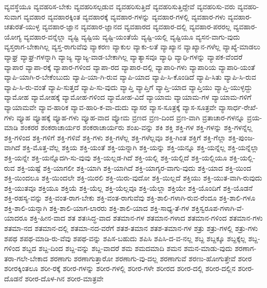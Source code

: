 {ವ್ಯವಸ್ಥೆಯೂ
ವ್ಯವಹರಿಸ-ಬೇಕು
ವ್ಯವಹರಿಸಲ್ಪಡುವ
ವ್ಯವಹರಿಸುತ್ತಿದೆ
ವ್ಯವಹರಿಸುತ್ತಿದ್ದೇವೆ
ವ್ಯವಹರಿಸು-ವರು
ವ್ಯವಹರಿ-ಸುವಾಗ
ವ್ಯವಹಾರ
ವ್ಯವಹಾರಕ್ಕಿಂತ
ವ್ಯವಹಾರಕ್ಕೆ
ವ್ಯವಹಾರ-ಗಳನ್ನು
ವ್ಯವಹಾರ-ಗಳಲ್ಲಿ
ವ್ಯವಹಾರ-ಗಳು
ವ್ಯವಹಾರ-ಚತುರತೆ-ಯುಳ್ಳ
ವ್ಯವಹಾರ-ಜ್ಞಾನ
ವ್ಯವಹಾರ-ಜ್ಞಾನದ
ವ್ಯವಹಾರದ
ವ್ಯವಹಾರ-ದಲ್ಲಿ
ವ್ಯವಹಾರ-ಪರರಲ್ಲ
ವ್ಯವಹಾರ-ಯೋಗ್ಯ
ವ್ಯವಹಾರ-ವನ್ನೆಲ್ಲಾ
ವ್ಯಷ್ಟಿ
ವ್ಯಷ್ಟಿಯ
ವ್ಯಷ್ಟಿ-ಯಂತೆಯೆ
ವ್ಯಷ್ಟಿ-ಯಲ್ಲಿ
ವ್ಯಷ್ಟಿಯೂ
ವ್ಯಸನ-ವಾಗು-ವುದು
ವ್ಯಸ್ತರಾಗ-ಬೇಕಾಗಿಲ್ಲ
ವ್ಯಸ್ತ-ರಾಗುವೆವು
ವ್ಯಾಕರಣ
ವ್ಯಾಕುಲ
ವ್ಯಾಕು-ಲತೆ
ವ್ಯಾಖ್ಯಾನ
ವ್ಯಾಖ್ಯಾನ-ಗಳೆಲ್ಲ
ವ್ಯಾಖ್ಯೆ-ಮಾಡಲು
ವ್ಯಾಘ್ರ
ವ್ಯಾಘ್ರ-ಗಳನ್ನಾಗಿ
ವ್ಯಾಜ್ಯ
ವ್ಯಾಜ್ಯ-ವಾಡ-ಬೇಕಾಗಿಲ್ಲ
ವ್ಯಾತ್ಯಾಸವೂ
ವ್ಯಾಧಿ
ವ್ಯಾಧಿ-ಗಳನ್ನು
ವ್ಯಾಪಕ-ವೆಂದರೆ
ವ್ಯಾಪಾರ
ವ್ಯಾಪಾ-ರಕ್ಕೆ
ವ್ಯಾಪಾರ-ಗಳಿಂದ
ವ್ಯಾಪಾ-ರದ
ವ್ಯಾಪಾರ-ದಲ್ಲಿ
ವ್ಯಾಪಾರಿ-ಗಳು
ವ್ಯಾಪಾರಿಯ
ವ್ಯಾಪಾರಿ-ಯಂತೆ
ವ್ಯಾಪಿ-ಯಾಗಿ-ರ-ಬೇಕೆಂಬುದು
ವ್ಯಾಪಿ-ಯಾ-ಗಿ-ರುವ
ವ್ಯಾಪಿ-ಯಾದ
ವ್ಯಾಪಿ-ಸಿ-ಕೊಂಡಿದೆ
ವ್ಯಾಪಿ-ಸಿತು
ವ್ಯಾಪಿ-ಸಿ-ರುವ
ವ್ಯಾಪಿ-ಸಿ-ರು-ವಂತೆ
ವ್ಯಾಪಿ-ಸುತ್ತದೆ
ವ್ಯಾಪಿ-ಸು-ವುದು
ವ್ಯಾಪ್ತಿ
ವ್ಯಾಪ್ತಿಗೆ
ವ್ಯಾಪ್ತಿ-ಯಾದ
ವ್ಯಾಪ್ತಿಯು
ವ್ಯಾಪ್ತಿ-ಯುಳ್ಳದ್ದು
ವ್ಯಾಮೋಹ
ವ್ಯಾಮೋಹಕ್ಕೆ
ವ್ಯಾಮೋಹ-ಗಳಿಂದ
ವ್ಯಾಮೋಹ-ವಿದೆ
ವ್ಯಾಯಾಮ
ವ್ಯಾಯಾಮ-ಗಳ
ವ್ಯಾಯಾಮ-ಗಳಿಗೆ
ವ್ಯಾಯಾಮವೇ
ವ್ಯಾವ-ಹಾರಿಕ
ವ್ಯಾವ-ಹಾರಿ-ಕ-ವಾ-ದುದು
ವ್ಯಾಸರ
ವ್ಯಾಸ-ಸೂತ್ರಕ್ಕೆ
ವ್ಯಾಸ-ಸೂತ್ರವೇ
ವ್ಯಾಸಾರ್ಧ-ರೇಖೆ-ಗಳು
ವ್ಯೂಹ
ವ್ಯೂಹಕ್ಕೆ
ವ್ಯೂಹ-ಗಳು
ವ್ಯೂಹ-ವಾದ
ವ್ಯೋಮ
ವ್ರಣದ
ವ್ರಣ-ದಿಂದ
ವ್ರಣ-ವಾಗಿ
ವ್ರತಾಚಾರ-ಗಳನ್ನೂ
ವ್ರಯ-ಮಾಡಿ
ಶಂಕರರ
ಶಂಕರಾಚಾರ್ಯರ
ಶಂಕರಾಚಾರ್ಯರು
ಶಂಖ-ವನ್ನು
ಶಕಿ
ಶಕ್ತಿ
ಶಕ್ತಿ-ಗಳ
ಶಕ್ತಿ-ಗಳನ್ನು
ಶಕ್ತಿ-ಗಳನ್ನೆಲ್ಲ
ಶಕ್ತಿ-ಗಳಿಂದ
ಶಕ್ತಿ-ಗಳಿಗೆ
ಶಕ್ತಿ-ಗಳಿವೆ
ಶಕ್ತಿ-ಗಳು
ಶಕ್ತಿ-ಗಳೆಲ್ಲ
ಶಕ್ತಿ-ಗಳೆಲ್ಲವೂ
ಶಕ್ತಿ-ಗಿಂತ
ಶಕ್ತಿಗೆ
ಶಕ್ತಿ-ಗೆಲ್ಲಾ
ಶಕ್ತಿ-ಪುಂಜ-ವಾಗಿದೆ
ಶಕ್ತಿ-ಮೊತ್ತ-ವೆಲ್ಲ
ಶಕ್ತಿಯ
ಶಕ್ತಿ-ಯಂತೆ
ಶಕ್ತಿ-ಯನ್ನಾಗಿ
ಶಕ್ತಿ-ಯನ್ನು
ಶಕ್ತಿ-ಯನ್ನೂ
ಶಕ್ತಿ-ಯನ್ನೆಲ್ಲ
ಶಕ್ತಿ-ಯನ್ನೆಲ್ಲಾ
ಶಕ್ತಿ-ಯನ್ನೇ
ಶಕ್ತಿ-ಯನ್ನೊದಗಿ-ಸು-ವುವು
ಶಕ್ತಿ-ಯಲ್ಲಡ-ಗಿದೆ
ಶಕ್ತಿ-ಯಲ್ಲಿ
ಶಕ್ತಿ-ಯಲ್ಲಿದೆ
ಶಕ್ತಿ-ಯಲ್ಲಿಯೂ
ಶಕ್ತಿ-ಯಲ್ಲಿ-ರುವ
ಶಕ್ತಿ-ಯಷ್ಟೆ
ಶಕ್ತಿ-ಯಾಗಲೀ
ಶಕ್ತಿ-ಯಾಗಿ
ಶಕ್ತಿ-ಯಾಗಿದೆ
ಶಕ್ತಿ-ಯಾಗ್ಯರ-ವಾಗು-ವುದು
ಶಕ್ತಿ-ಯಾದ
ಶಕ್ತಿ-ಯಿಂದ
ಶಕ್ತಿ-ಯಿಂದಲೂ
ಶಕ್ತಿ-ಯಿಂದಲೇ
ಶಕ್ತಿ-ಯಿರಲಿ
ಶಕ್ತಿ-ಯಿರು-ವುದೋ
ಶಕ್ತಿ-ಯಿಲ್ಲದೆ
ಶಕ್ತಿಯು
ಶಕ್ತಿ-ಯುತ-ವಾಗಿ-ರುವುದು
ಶಕ್ತಿ-ಯುತವೂ
ಶಕ್ತಿಯೂ
ಶಕ್ತಿಯೆ
ಶಕ್ತಿ-ಯೆಲ್ಲ
ಶಕ್ತಿ-ಯೆಲ್ಲವೂ
ಶಕ್ತಿ-ಯೆಲ್ಲಾ
ಶಕ್ತಿಯೇ
ಶಕ್ತಿ-ಯೊಂದಿಗೆ
ಶಕ್ತಿ-ಯೊಡನೆ
ಶಕ್ತಿ-ರಹಸ್ಯ-ವನ್ನು
ಶಕ್ತಿ-ವಂತ-ರಾಗ-ಬೇಕು
ಶಕ್ತಿ-ವಂತ-ರಾಗುವೆವು
ಶಕ್ತಿ-ಶಾಲಿ-ಗಳಾಗಿ-ರುವ-ರೆಂದೂ
ಶಕ್ತಿ-ಶಾಲಿ-ಗಳೂ
ಶಕ್ತಿ-ಶಾಲಿ-ಯನ್ನಾಗಿ
ಶಕ್ತಿ-ಶಾಲಿ-ಯಾಗ-ಲಾರರು
ಶಕ್ತಿ-ಶಾಲಿ-ಯಾದ
ಶಕ್ತಿ-ಸಾಧ್ಯ-ತೆ-ಗಳ
ಶಕ್ತಿಸ್ವರೂಪ-ಗಳಾಗಿ-ವೆ-ಯಾದರೂ
ಶಕ್ತಿ-ಹೀನ-ವಾದ
ಶತ
ಶತಃಸಿದ್ಧ-ವಾದ
ಶತಮಾನ-ಗಳ
ಶತಮಾನ-ಗಳಾದ
ಶತಮಾನ-ಗಳಿಂದ
ಶತಮಾನ-ಗಳು
ಶತಮಾ-ನದ
ಶತಮಾನ-ದಲ್ಲಿ
ಶತಮಾ-ನದ-ವರೆಗೆ
ಶತಶ-ತಮಾನ
ಶತಶ-ತಮಾನ-ಗಳ
ಶತ್ರು
ಶತ್ರು-ಗಳಲ್ಲಿ
ಶತ್ರು-ಗಳು
ಶಪಥ
ಶಪಥ-ಮಾಡಿ-ರು-ವೆವು
ಶಪಥ-ವನ್ನು
ಶಪಿಸ-ಬಹುದು
ಶಪಿಸಿ
ಶಪಿಸಿ-ದ-ವ-ನಲ್ಲ
ಶಬ್ದ
ಶಬ್ದಕ್ಕೂ
ಶಬ್ದಕ್ಕೆಲ್ಲ
ಶಬ್ದ-ಗಳಿಂದ
ಶಬ್ದದ
ಶಬ್ದ-ದಿಂದ
ಶಬ್ದ-ವನ್ನು
ಶಬ್ದ-ವಾದರೆ
ಶಮ
ಶಮದಮಾದಿ
ಶಮನ
ಶಮನ-ಮಾಡು-ವುದು
ಶರಣಾಗ-ತರಾ-ಗಲೇ-ಬೇಕಾದ
ಶರಣಾಗು
ಶರಣಾಗುತ್ತಾರೋ
ಶರಣಾಗು-ವು-ದಲ್ಲ
ಶರಣಾಗುವೆ
ಶರಣು-ಹೋಗುತ್ತೇವೆ
ಶರೀರ
ಶರೀರಕ್ಕಿಂತಲೂ
ಶರೀ-ರಕ್ಕೆ
ಶರೀರ-ಗಳನ್ನು
ಶರೀರ-ಗಳಲ್ಲಿ
ಶರೀರ-ಗಳೇ
ಶರೀರದ
ಶರೀರ-ದಲ್ಲಿ
ಶರೀರ-ದಲ್ಲಿನ
ಶರೀರ-ದೊಡನೆ
ಶರೀರ-ದೊಳ-ಗಿನ
ಶರೀರ-ಮಾತ್ರವೇ
}
